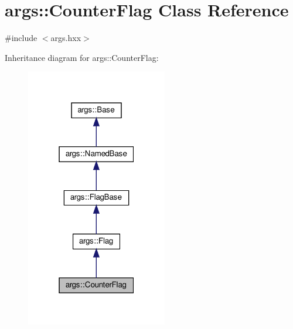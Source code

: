 \hypertarget{classargs_1_1_counter_flag}{}\section{args\+:\+:Counter\+Flag Class Reference}
\label{classargs_1_1_counter_flag}


{\ttfamily \#include $<$args.\+hxx$>$}



Inheritance diagram for args\+:\+:Counter\+Flag\+:\nopagebreak
\begin{figure}[H]
\begin{center}
\leavevmode
\includegraphics[width=175pt]{classargs_1_1_counter_flag__inherit__graph}
\end{center}
\end{figure}


